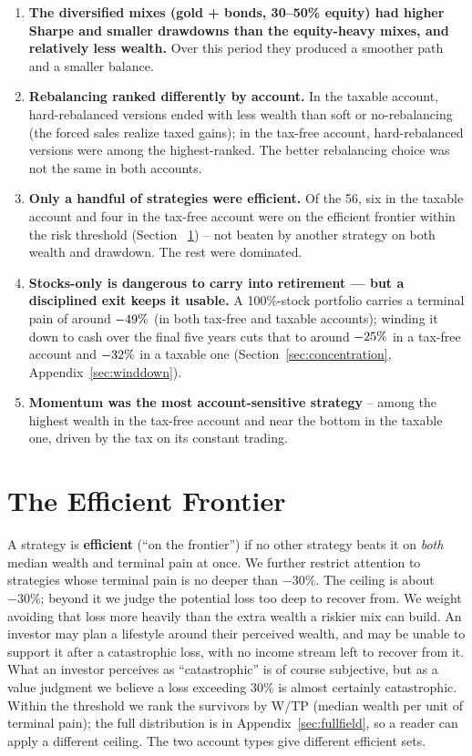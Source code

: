 \documentclass[11pt]{article}
\begin{document}
\begin{enumerate}
\item \textbf{The diversified mixes (gold + bonds, 30--50\% equity) had higher Sharpe and smaller
drawdowns than the equity-heavy mixes, and relatively less wealth.} Over this period they produced a
smoother path and a smaller balance.

\item \textbf{Rebalancing ranked differently by account.} In the taxable account, hard-rebalanced
versions ended with less wealth than soft or no-rebalancing (the forced sales realize taxed gains); in
the tax-free account, hard-rebalanced versions were among the highest-ranked. The better rebalancing
choice was not the same in both accounts.

\item \textbf{Only a handful of strategies were efficient.} Of the 56, six in the taxable account and
four in the tax-free account were on the efficient frontier within the risk threshold (Section~%
\ref{sec:frontier}) -- not beaten by another strategy on both wealth and drawdown. The rest were
dominated.

\item \textbf{Stocks-only is dangerous to carry into retirement --- but a disciplined exit keeps it
usable.} A 100\%-stock portfolio carries a terminal pain of around $-49\%$ (in both
tax-free and taxable accounts); winding it down to cash over the final five years cuts that to around
$-25\%$ in a tax-free account and $-32\%$ in a taxable one
(Section~\ref{sec:concentration}, Appendix~\ref{sec:winddown}).

\item \textbf{Momentum was the most account-sensitive strategy} -- among the highest wealth in the
tax-free account and near the bottom in the taxable one, driven by the tax on its constant trading.

\end{enumerate}

\section{The Efficient Frontier}\label{sec:frontier}

A strategy is \textbf{efficient} (``on the frontier'') if no other strategy beats it on \emph{both}
median wealth and terminal pain at once. We further restrict attention to strategies whose terminal
pain is no deeper than \textbf{$-30\%$}. The ceiling is about $-30\%$; beyond it we judge the potential
loss too deep to recover from. We weight avoiding that loss more heavily than the extra wealth a riskier
mix can build. An investor may plan a lifestyle around their perceived wealth, and may be unable to
support it after a catastrophic loss, with no income stream left to recover from it. What an investor
perceives as ``catastrophic'' is of course subjective, but as a value judgment we believe a loss
exceeding $30\%$ is almost certainly catastrophic. Within the threshold we rank the survivors by W/TP
(median wealth per unit of terminal pain); the full distribution is in Appendix~\ref{sec:fullfield}, so
a reader can apply a different ceiling. The two account types give different efficient sets.
\end{document}
